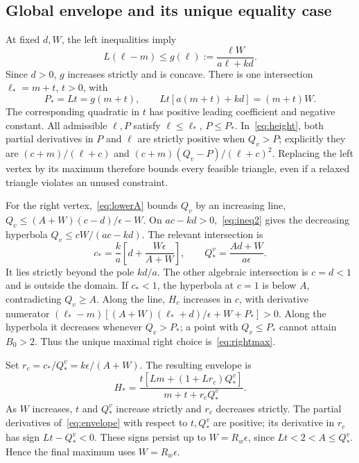 \subsection{Global envelope and its unique equality case}
At fixed $d,W$, the left inequalities imply
\begin{equation}
 L(\ell-m)\le g(\ell):=\frac{\ell W}{a\ell+kd}.
\end{equation}
Since $d>0$, $g$ increases strictly and is concave. There is one intersection $\ell_*=m+t$, $t>0$, with
\begin{equation}
 P_*=Lt=g(m+t),\qquad Lt[a(m+t)+kd]=(m+t)W.\label{eq:leftmax}
\end{equation}
The corresponding quadratic in $t$ has positive leading coefficient and negative constant. All admissible $\ell,P$ satisfy $\ell\le\ell_*$, $P\le P_*$. In~\eqref{eq:height}, both partial derivatives in $P$ and $\ell$ are strictly positive when $Q_v>P$; explicitly they are $(c+m)/(\ell+c)$ and $(c+m)(Q_v-P)/(\ell+c)^2$. Replacing the left vertex by its maximum therefore bounds every feasible triangle, even if a relaxed triangle violates an unused constraint.

For the right vertex,~\eqref{eq:lowerA} bounds $Q_v$ by an increasing line,
$Q_v\le (A+W)(c-d)/\epsilon-W$. On $ac-kd>0$,~\eqref{eq:ineq2} gives the decreasing hyperbola $Q_v\le cW/(ac-kd)$. The relevant intersection is
\begin{equation}
 c_* =\frac{k}{a}\left[d+\frac{W\epsilon}{A+W}\right],\qquad
 Q_*^v=\frac{Ad+W}{a\epsilon}.\label{eq:rightmax}
\end{equation}
It lies strictly beyond the pole $kd/a$. The other algebraic intersection is $c=d<1$ and is outside the domain. If $c_*<1$, the hyperbola at $c=1$ is below $A$, contradicting $Q_v\ge A$. Along the line, $H_c$ increases in $c$, with derivative numerator $(\ell_*-m)[(A+W)(\ell_*+d)/\epsilon+W+P_*]>0$. Along the hyperbola it decreases whenever $Q_v>P_*$; a point with $Q_v\le P_*$ cannot attain $B_0>2$. Thus the unique maximal right choice is~\eqref{eq:rightmax}.

Set $r_c=c_*/Q_*^v=k\epsilon/(A+W)$. The resulting envelope is
\begin{equation}
 H_* =\frac{t[Lm+(1+Lr_c)Q_*^v]}{m+t+r_cQ_*^v}.\label{eq:envelope}
\end{equation}
As $W$ increases, $t$ and $Q_*^v$ increase strictly and $r_c$ decreases strictly. The partial derivatives of~\eqref{eq:envelope} with respect to $t,Q_*^v$ are positive; its derivative in $r_c$ has sign $Lt-Q_*^v<0$. These signs persist up to $W=R_w\epsilon$, since $Lt<2<A\le Q_*^v$. Hence the final maximum uses $W=R_w\epsilon$.


